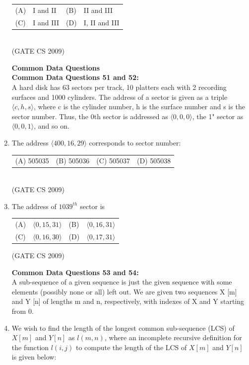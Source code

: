 \documentclass[a4paper, 11pt]{article}
\begin{document}
\begin{enumerate}
    \begin{tabularx}{\textwidth}{@{}lX lX@{}}
    (A) &  I and II  &  (B) &  II and III\\
    (C) &  I and III & (D)  &  I, II and III\\
    \end{tabularx}  \\
    
    \hfill (GATE CS 2009)

    \textbf{{\LARGE Common Data Questions}} \\
    \textbf{\big Common Data Questions 51 and 52:} \\
    A hard disk has 63 sectors per track, 10 platters each with 2 recording surfaces and 1000 cylinders. The address of a sector is given as a triple $\langle c,h,s \rangle$, where c is the cylinder number, h is the surface number and s is the sector number. Thus, the 0th sector is addressed as $\langle 0,0,0 \rangle$, the 1" sector as $\langle 0,0,1 \rangle $, and so on.
    \item The address $\langle 400,16,29 \rangle$ corresponds to sector number:\\
    \begin{tabularx}{\textwidth}{@{}XXXX@{}}
       (A)  505035  & (B) 505036 & (C) 505037 & (D) 505038  \\
    \end{tabularx}\\
    
    \hfill (GATE CS 2009)

    \item The address of $1039^{th}$ sector is\\
    \begin{tabularx}{\textwidth}{@{}lX lX@{}}
    (A) &  $\langle 0,15,31 \rangle$  &  (B) &  $\langle 0,16,31\rangle$   \\
    (C) &  $\langle 0,16,30 \rangle$   & (D)  &  $\langle 0,17,31 \rangle$  \\
    \end{tabularx}  
    
    \hfill (GATE CS 2009)

    \textbf{\big Common Data Questions 53 and 54:} \\
    A sub-sequence of a given sequence is just the given sequence with some elements (possibly none or all) left out. We are given two sequences X [m] and Y [n] of lengths m and n, respectively, with indexes of X and Y starting from 0.
    \item We wish to find the length of the longest common sub-sequence (LCS) of $X[m]$ and $Y[n]$ as $l(m, n)$, where an incomplete recursive definition for the function $l(i, j)$ to compute the length of the LCS of $X[m]$ and $Y[n]$ is given below:\\
    

\end{enumerate}
\end{document}
